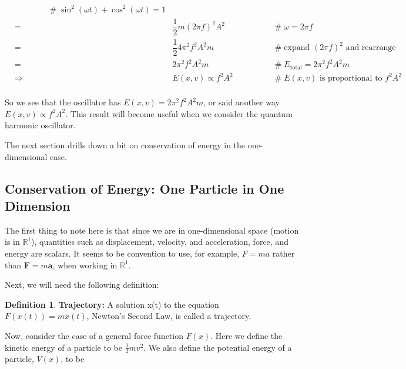 \documentclass{article}
\theoremstyle{definition}
\newtheorem{definition}{Definition}[section]
\begin{document}
\begin{equation*}
\begin{array}{llll}
						&\hspace{4em} \mathrel{\#} \sin^2 (\omega t) + \cos^2 (\omega t) = 1 \\
[12pt]
&=& \dfrac{1}{2} m (2 \pi f)^2 A^2 
						&\hspace{4em} \mathrel{\#} \omega = 2 \pi f \\
[12pt]
&=& \dfrac{1}{2} 4 \pi^2 f^2 A^2 m
						&\hspace{4em} \mathrel{\#} \text{expand $\left (2 \pi f \right)^2$ 
						                           and rearrange} \\
[12pt]
&=& 2 \pi^2 f^2 A^2 m
						&\hspace{4em} \mathrel{\#} E_{\text{total}} = 2 \pi^2 f^2 A^2 m\\
[12pt]
&\Rightarrow& E(x,v) \propto f^2 A^2 
						&\hspace{4em} \mathrel{\#} \text{$E(x,v)$ is proportional to $f^2 A^2$}\\

\end{array}
\end{equation*}

\bigskip
\noindent
So we see that the oscillator has $E(x,v) = 2
\pi^2 f^2 A^2 m$, or said another way $E(x,v)\propto
f^2 A^2$. This result will become useful when we consider the
quantum harmonic oscillator.

\bigskip
\noindent
The next section drills down a bit on conservation of energy
in the one-dimensional case.


\subsection{Conservation of Energy: One Particle in One Dimension}
\label{subsec:conservation_of_energy}
The first thing to note here is that since we are in one-dimensional
space (motion is in $\mathbb{R}^{1}$), quantities such as displacement,
velocity, and acceleration, force, and energy are scalars. It seems to 
be convention to use, for example, $F = ma$ rather than 
$\mathbf{F} = m \mathbf{a}$, when working in $\mathbb{R}^{1}$.

\bigskip
\noindent
Next, we will need the following definition:

\medskip
\begin{definition}
{\bf Trajectory:} A solution x(t) to the equation $F(x(t)) = m \ddot{x}(t)$,
Newton’s Second Law, is called a trajectory.
\end{definition}

\medskip
\noindent
Now, consider the case of a general force function $F(x)$. Here we define 
the kinetic energy of a particle to be $\frac{1}{2}mv^{2}$. We also 
define the potential energy of a particle, $V(x)$, to be 
\end{document}
